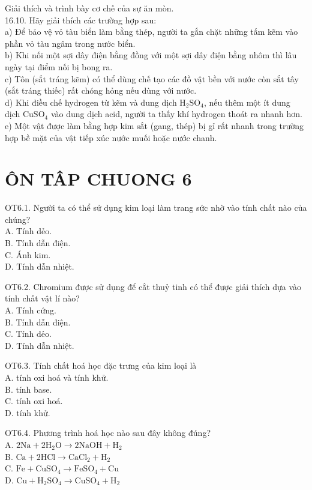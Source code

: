 \documentclass[10pt]{article}
\begin{document}
Giải thích và trình bày cơ chế của sự ăn mòn.\\
16.10. Hãy giải thích các trường hợp sau:\\
a) Để bảo vệ vỏ tàu biển làm bằng thép, người ta gắn chặt những tấm kẽm vào phần vỏ tàu ngâm trong nước biển.\\
b) Khi nối một sợi dây điện bằng đồng với một sợi dây điện bằng nhôm thì lâu ngày tại điểm nối bị bong ra.\\
c) Tôn (sắt tráng kẽm) có thể dùng chế tạo các đồ vật bền với nước còn sắt tây (sắt tráng thiếc) rất chóng hỏng nếu dùng với nước.\\
d) Khi điều chế hydrogen từ kẽm và dung dịch $\mathrm{H}_{2} \mathrm{SO}_{4}$, nếu thêm một ít dung dịch $\mathrm{CuSO}_{4}$ vào dung dịch acid, người ta thấy khí hydrogen thoát ra nhanh hơn.\\
e) Một vật được làm bằng hợp kim sắt (gang, thép) bị gỉ rất nhanh trong trường hợp bề mặt của vật tiếp xúc nước muối hoặc nước chanh.

\section*{ÔN TÂP CHUONG 6}
OT6.1. Người ta có thể sử dụng kim loại làm trang sức nhờ vào tính chất nào của chúng?\\
A. Tính dẻo.\\
B. Tính dẫn điện.\\
C. Ánh kim.\\
D. Tính dẫn nhiệt.

OT6.2. Chromium được sử dụng để cắt thuỷ tinh có thể được giải thích dựa vào tính chất vật lí nào?\\
A. Tính cứng.\\
B. Tính dẫn điện.\\
C. Tính dẻo.\\
D. Tính dẫn nhiệt.

OT6.3. Tính chất hoá học đặc trưng của kim loại là\\
A. tính oxi hoá và tính khử.\\
B. tính base.\\
C. tính oxi hoá.\\
D. tính khử.

OT6.4. Phương trình hoá học nào sau đây không đúng?\\
A. $2 \mathrm{Na}+2 \mathrm{H}_{2} \mathrm{O} \rightarrow 2 \mathrm{NaOH}+\mathrm{H}_{2}$\\
B. $\mathrm{Ca}+2 \mathrm{HCl} \rightarrow \mathrm{CaCl}_{2}+\mathrm{H}_{2}$\\
C. $\mathrm{Fe}+\mathrm{CuSO}_{4} \rightarrow \mathrm{FeSO}_{4}+\mathrm{Cu}$\\
D. $\mathrm{Cu}+\mathrm{H}_{2} \mathrm{SO}_{4} \rightarrow \mathrm{CuSO}_{4}+\mathrm{H}_{2}$
\end{document}
